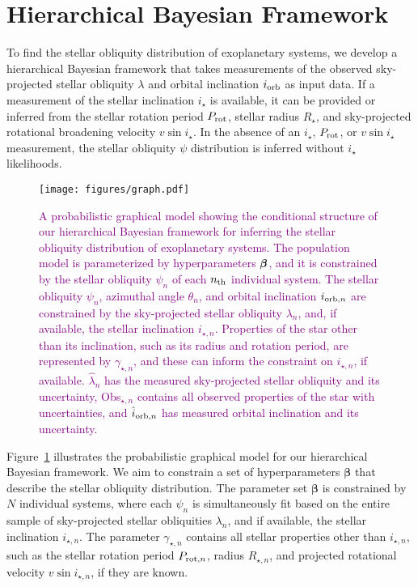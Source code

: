 \documentclass[twocolumn,times]{aastex631}
\newcommand{\edits}[1]{\textcolor{purple}{#1}}
\begin{document}
\section{Hierarchical Bayesian Framework}\label{sec:hbm}

To find the stellar obliquity distribution of exoplanetary systems, we develop a hierarchical Bayesian framework that takes measurements of the observed sky-projected stellar obliquity $\lambda$ and orbital inclination $i_{\rm orb}$ as input data.
If a measurement of the stellar inclination $i_\star$ is available, it can be provided or inferred from the stellar rotation period $P_{\rm rot}$, stellar radius $R_\star$, and sky-projected rotational broadening velocity $v\sin{i}_\star$.
In the absence of an $i_\star$, $P_{\rm rot}$, or $v\sin{i}_\star$ measurement, the stellar obliquity $\psi$ distribution is inferred without $i_\star$ likelihoods.

\begin{figure}[ht!]
    \centering
    \texttt{[image: figures/graph.pdf]}
    \caption{\edits{A probabilistic graphical model showing the conditional structure of our hierarchical Bayesian framework for inferring the stellar obliquity distribution of exoplanetary systems. The population model is parameterized by hyperparameters $\vb*{\beta}$, and it is constrained by the stellar obliquity $\psi_n$ of each $n_{\rm th}$ individual system. The stellar obliquity $\psi_n$, azimuthal angle $\theta_n$, and orbital inclination $i_{{\rm orb}, n}$ are constrained by the sky-projected stellar obliquity $\lambda_n$, and, if available, the stellar inclination $i_{\star, n}$.
    Properties of the star other than its inclination, such as its radius and rotation period, are represented by $\gamma_{\star, n}$, and these can inform the constraint on $i_{\star, n}$, if available. 
    $\hat{\lambda}_n$ has the measured sky-projected stellar obliquity and its uncertainty, Obs$_{\star,n}$ contains all observed properties of the star with uncertainties, and $\hat{i}_{{\rm orb}, n}$ has measured orbital inclination and its uncertainty.}}
    \label{fig:graph}
\end{figure}

Figure~\ref{fig:graph} illustrates the probabilistic graphical model for our hierarchical Bayesian framework. We aim to constrain a set of hyperparameters $\bm{\beta}$ that describe the stellar obliquity distribution. The parameter set $\bm{\beta}$ is constrained by $N$ individual systems, where each $\psi_n$ is simultaneously fit based on the entire sample of sky-projected stellar obliquities $\lambda_n$, and if available, the stellar inclination $i_{\star, n}$. 
The parameter $\gamma_{\star, n}$ contains all stellar properties other than $i_{\star,n}$, such as the stellar rotation period $P_{{\rm rot},n}$, radius $R_{\star,n}$, and projected rotational velocity $v\sin{i_{\star,n}}$, if they are known.
\end{document}
